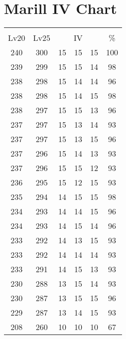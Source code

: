 \documentclass{article}%
\begin{document}
%
\normalsize%
\section{Marill IV Chart}%
\label{sec:Marill IV Chart}%
\renewcommand{\arraystretch}{1.5}%
\begin{tabular}{|c|c|c|c|c|c|}%
\hline%
\multicolumn{6}{|c|}{\textcolor{white}{ 
\linebreak{Marill}
}%
\cellcolor{black}}\\%
\multicolumn{1}{|c}{Lv20}&\multicolumn{1}{c|}{Lv25}&\multicolumn{3}{c|}{IV}&\multicolumn{1}{|c|}{\%}\\%
\hline%
\rowcolor{color100}%
240&300&15&15&15&100\\%
\hline%
\rowcolor{color98}%
239&299&15&15&14&98\\%
\hline%
\rowcolor{color96}%
238&298&15&14&14&96\\%
\hline%
\rowcolor{color98}%
238&298&15&14&15&98\\%
\hline%
\rowcolor{color96}%
238&297&15&15&13&96\\%
\hline%
\rowcolor{color93}%
237&297&15&13&14&93\\%
\hline%
\rowcolor{color96}%
237&297&15&13&15&96\\%
\hline%
\rowcolor{color93}%
237&296&15&14&13&93\\%
\hline%
\rowcolor{color93}%
237&296&15&15&12&93\\%
\hline%
\rowcolor{color93}%
236&295&15&12&15&93\\%
\hline%
\rowcolor{color98}%
235&294&14&15&15&98\\%
\hline%
\rowcolor{color96}%
234&293&14&14&15&96\\%
\hline%
\rowcolor{color96}%
234&293&14&15&14&96\\%
\hline%
\rowcolor{color93}%
233&292&14&13&15&93\\%
\hline%
\rowcolor{color93}%
233&292&14&14&14&93\\%
\hline%
\rowcolor{color93}%
233&291&14&15&13&93\\%
\hline%
\rowcolor{color93}%
230&288&13&15&14&93\\%
\hline%
\rowcolor{color96}%
230&287&13&15&15&96\\%
\hline%
\rowcolor{color93}%
229&287&13&14&15&93\\%
\hline%
\rowcolor{color91}%
208&260&10&10&10&67\\%
\end{tabular}

%
\end{document}
